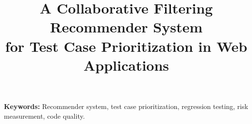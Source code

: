 \documentclass[10pt,conference]{IEEEtran}
\begin{document}


\pagestyle{plain}

 \title{A Collaborative Filtering Recommender System \\ 
for Test Case Prioritization in Web Applications}




\maketitle
\thispagestyle{empty}




\textbf{Keywords: }{Recommender system, test case prioritization, 
regression testing, risk measurement, code quality.}

%









%

\balance


\end{document}
